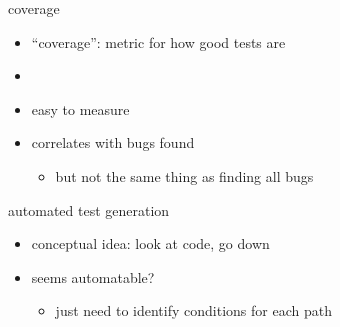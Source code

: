 
\begin{frame}{coverage}
    \begin{itemize}
        \item ``coverage'': metric for how good tests are
        \vspace{.5cm}
        \item {}
        \item easy to measure
        \item correlates with bugs found
            \begin{itemize}
            \item but not the same thing as finding all bugs
            \end{itemize}
    \end{itemize}
\end{frame}

\begin{frame}{automated test generation}
    \begin{itemize}
        \item conceptual idea: look at code, go down 
    \item seems automatable?
        \begin{itemize}
        \item just need to identify conditions for each path
        \end{itemize}
    \end{itemize}
\end{frame}

